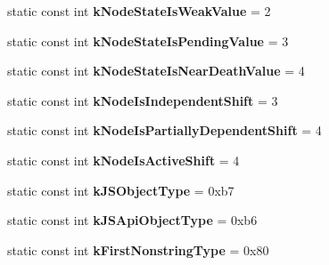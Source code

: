 \begin{DoxyCompactItemize}
\item 
static const int {\bfseries k\+Node\+State\+Is\+Weak\+Value} = 2\hypertarget{classv8_1_1internal_1_1Internals_a8a5d4cc92a6952c2a50922c77a606e68}{}\label{classv8_1_1internal_1_1Internals_a8a5d4cc92a6952c2a50922c77a606e68}

\item 
static const int {\bfseries k\+Node\+State\+Is\+Pending\+Value} = 3\hypertarget{classv8_1_1internal_1_1Internals_a843b53b17257ecd957eade0d9f21c5ab}{}\label{classv8_1_1internal_1_1Internals_a843b53b17257ecd957eade0d9f21c5ab}

\item 
static const int {\bfseries k\+Node\+State\+Is\+Near\+Death\+Value} = 4\hypertarget{classv8_1_1internal_1_1Internals_a18f3e757639b07bdabb8cda7dd4a8bdb}{}\label{classv8_1_1internal_1_1Internals_a18f3e757639b07bdabb8cda7dd4a8bdb}

\item 
static const int {\bfseries k\+Node\+Is\+Independent\+Shift} = 3\hypertarget{classv8_1_1internal_1_1Internals_a228b2b58c77c17bc512b92d9e3aea48b}{}\label{classv8_1_1internal_1_1Internals_a228b2b58c77c17bc512b92d9e3aea48b}

\item 
static const int {\bfseries k\+Node\+Is\+Partially\+Dependent\+Shift} = 4\hypertarget{classv8_1_1internal_1_1Internals_aeda4d6fc1bd10ca57398597f3bb496f3}{}\label{classv8_1_1internal_1_1Internals_aeda4d6fc1bd10ca57398597f3bb496f3}

\item 
static const int {\bfseries k\+Node\+Is\+Active\+Shift} = 4\hypertarget{classv8_1_1internal_1_1Internals_a34e042b2fa0c64f133d1605819678b36}{}\label{classv8_1_1internal_1_1Internals_a34e042b2fa0c64f133d1605819678b36}

\item 
static const int {\bfseries k\+J\+S\+Object\+Type} = 0xb7\hypertarget{classv8_1_1internal_1_1Internals_a56b7062df5d9a7df491137d4c3341bcc}{}\label{classv8_1_1internal_1_1Internals_a56b7062df5d9a7df491137d4c3341bcc}

\item 
static const int {\bfseries k\+J\+S\+Api\+Object\+Type} = 0xb6\hypertarget{classv8_1_1internal_1_1Internals_aef1693d7df34df433622fdb3e26767c8}{}\label{classv8_1_1internal_1_1Internals_aef1693d7df34df433622fdb3e26767c8}

\item 
static const int {\bfseries k\+First\+Nonstring\+Type} = 0x80\hypertarget{classv8_1_1internal_1_1Internals_a6f4a54927b01a11f444fb2f00b47ca1d}{}\label{classv8_1_1internal_1_1Internals_a6f4a54927b01a11f444fb2f00b47ca1d}


\end{DoxyCompactItemize}
